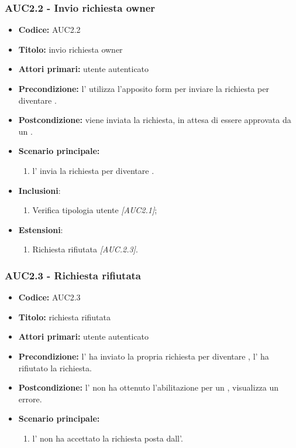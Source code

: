 \documentclass[casi-duso]{subfiles}
\begin{document}
\subsubsection{AUC2.2 - Invio richiesta owner}
\label{subsub:AUC2.2}
\begin{itemize}
  \item \textbf{Codice:} AUC2.2
  \item \textbf{Titolo:} invio richiesta owner
  \item \textbf{Attori primari:} utente autenticato
  \item \textbf{Precondizione:} l' utilizza l'apposito form per inviare la richiesta per diventare .
  \item \textbf{Postcondizione:} viene inviata la richiesta, in attesa di essere approvata da un .
  \item \textbf{Scenario principale:} 
  \begin{enumerate}
    \item l' invia la richiesta per diventare .
  \end{enumerate}
  \item \textbf{Inclusioni}:
  \begin{enumerate}
    \item Verifica tipologia utente \emph{[AUC2.1]};
  \end{enumerate}
  \item \textbf{Estensioni}:
  \begin{enumerate}
    \item Richiesta rifiutata \emph{[AUC.2.3]}.
  \end{enumerate}
\end{itemize}

\subsubsection{AUC2.3 - Richiesta rifiutata}
\label{subsub:AUC2.3}
\begin{itemize}
  \item \textbf{Codice:} AUC2.3
  \item \textbf{Titolo:} richiesta rifiutata
  \item \textbf{Attori primari:} utente autenticato
  \item \textbf{Precondizione:} l' ha inviato la propria richiesta per diventare , l' ha rifiutato la richiesta.
  \item \textbf{Postcondizione:} l' non ha ottenuto l'abilitazione per un , visualizza un errore.
  \item \textbf{Scenario principale:} 
  \begin{enumerate}
    \item l' non ha accettato la richiesta posta dall'.
  \end{enumerate}
\end{itemize}
\end{document}
